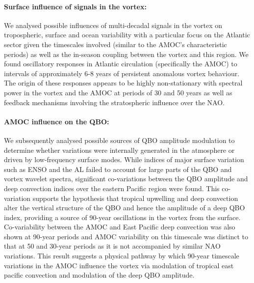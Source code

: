 \paragraph{Surface influence of signals in the vortex:}
We analysed possible influences of multi-decadal signals in the vortex on tropospheric, surface and ocean variability with a particular focus on the Atlantic sector given the timescales involved (similar to the AMOC's characteristic periods) as well as the in-season coupling between the vortex and this region. We found oscillatory responses in Atlantic circulation (specifically the AMOC) to intervals of approximately 6-8 years of persistent anomalous vortex behaviour. The origin of these responses appears to be highly non-stationary with spectral power in the vortex and the AMOC at periods of 30 and 50 years as well as feedback mechanisms involving the stratospheric influence over the NAO. 

\paragraph{AMOC influence on the QBO:}
We subsequently analysed possible sources of QBO amplitude modulation to determine whether variations were internally generated in the atmosphere or driven by low-frequency surface modes. While indices of major surface variation such as ENSO and the AL failed to account for large parts of the QBO and vortex wavelet spectra, significant co-variations between the QBO amplitude and deep convection indices over the eastern Pacific region were found. This co-variation supports the hypothesis that tropical upwelling and deep convection alter the vertical structure of the QBO and hence the amplitude of a deep QBO index, providing a source of 90-year oscillations in the vortex from the surface. Co-variability between the AMOC and East Pacific deep convection was also shown at 90-year periods and AMOC variability on this timescale was distinct to that at 50 and 30-year periods as it is not accompanied by similar NAO variations. This result suggests a physical pathway by which 90-year timescale variations in the AMOC influence the vortex via modulation of tropical east pacific convection and modulation of the deep QBO amplitude. 

